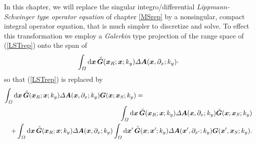 In this chapter, we will replace the singular 
integro/differential {\em Lippmann- Schwinger type operator 
equation\/} of chapter \ref{MSrep}  by a nonsingular, compact integral operator equation, that 
is much simpler to discretize and solve. To effect this transformation we
employ a {\em Galerkin\/} type projection 
of the range space of (\ref{LSTrep}) onto the span of 
\[
\int_{{\mit \Omega}}{\rm d}{\mbox{\boldmath$\mit x$\unboldmath}}\, {\stackrel{\scriptscriptstyle _{\,\,\circ}}{ \mbox{\boldmath$\mit G$\unboldmath}}}({\mbox{\boldmath$\mit x$\unboldmath}}_{R};{\mbox{\boldmath$\mit x$\unboldmath}};k_y)
{\mit \Delta} {\mbox{\boldmath$\mit A$\unboldmath}}({\mbox{\boldmath$\mit x$\unboldmath}},\partial_{x};k_y) \cdot
\]
so that (\ref{LSTrep}) is replaced by
\begin{eqnarray} \label{LSTrep1}
\lefteqn{\int_{{\mit \Omega}} {\rm d}{\bmi x}\,{\rf{\bmi G}}({\bmi x}_{R};{\bmi x};k_y)
{\mit \Delta} {\bmi A}({\bmi
x},\partial_{x};k_y){{\bmi G}}({\bmi x};{\bmi x}_{S};k_y)=}\nonumber\\
&&
\int_{{\mit \Omega}} {\rm d}{\bmi x}\,{\rf{\bmi G}}({\bmi x}_{R};{\bmi x};k_y)
{\mit \Delta} {\bmi A}({\bmi
x},\partial_{x};k_y){\rf{\bmi G}}({\bmi x};{\bmi x}_{S};k_y)\\
&&+\int_{{\mit \Omega}} {\rm d}{\bmi x}\, {\rf{\bmi G}}({\bmi x}_{R};{\bmi x};k_y)
{\mit \Delta} {\bmi A}({\bmi
x},\partial_{x};k_y)\int_{{\mit \Omega}}{\rm d}{\bmi x}^{\prime}\, 
{\rf{\bmi G}}({\bmi x};{\bmi x}^{\prime};k_y)
{\mit \Delta} {\bmi A}({\bmi
x}^{\prime},\partial_{x^{\prime}};k_y) {\bmi G}({\bmi x}^{\prime},{\bmi 
x}_{S};k_y) .
\nonumber
\end{eqnarray}

